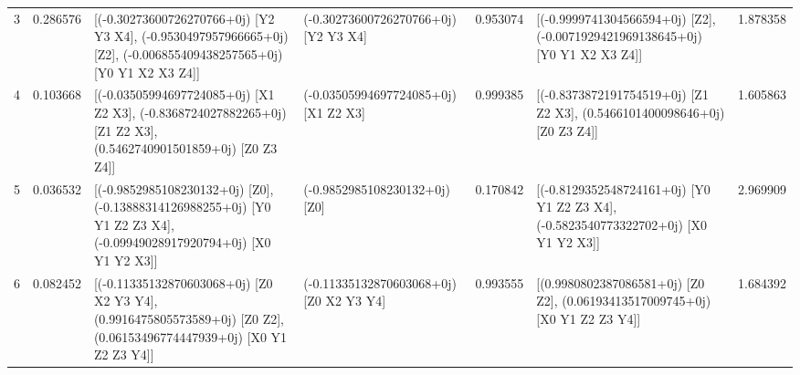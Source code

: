 \begin{tabular}{rrllrlr}
       3 &      0.286576 &                                                                                                                                                                                                                                              [(-0.30273600726270766+0j) [Y2 Y3 X4], (-0.9530497957966665+0j) [Z2], (-0.006855409438257565+0j) [Y0 Y1 X2 X3 Z4]] &         (-0.30273600726270766+0j) [Y2 Y3 X4] &      0.953074 &                                                                                                                                                                                                                                              [(-0.9999741304566594+0j) [Z2], (-0.0071929421969138645+0j) [Y0 Y1 X2 X3 Z4]] &  1.878358 \\
       4 &      0.103668 &                                                                                                                                                                                                                                                 [(-0.03505994697724085+0j) [X1 Z2 X3], (-0.8368724027882265+0j) [Z1 Z2 X3], (0.5462740901501859+0j) [Z0 Z3 Z4]] &         (-0.03505994697724085+0j) [X1 Z2 X3] &      0.999385 &                                                                                                                                                                                                                                                  [(-0.8373872191754519+0j) [Z1 Z2 X3], (0.5466101400098646+0j) [Z0 Z3 Z4]] &  1.605863 \\
       5 &      0.036532 &                                                                                                                                                                                                                                            [(-0.9852985108230132+0j) [Z0], (-0.13888314126988255+0j) [Y0 Y1 Z2 Z3 X4], (-0.09949028917920794+0j) [X0 Y1 Y2 X3]] &                (-0.9852985108230132+0j) [Z0] &      0.170842 &                                                                                                                                                                                                                                        [(-0.8129352548724161+0j) [Y0 Y1 Z2 Z3 X4], (-0.5823540773322702+0j) [X0 Y1 Y2 X3]] &  2.969909 \\
       6 &      0.082452 &                                                                                                                                                                                                                                           [(-0.11335132870603068+0j) [Z0 X2 Y3 Y4], (0.9916475805573589+0j) [Z0 Z2], (0.06153496774447939+0j) [X0 Y1 Z2 Z3 Y4]] &      (-0.11335132870603068+0j) [Z0 X2 Y3 Y4] &      0.993555 &                                                                                                                                                                                                                                               [(0.9980802387086581+0j) [Z0 Z2], (0.06193413517009745+0j) [X0 Y1 Z2 Z3 Y4]] &  1.684392 \\

\end{tabular}
